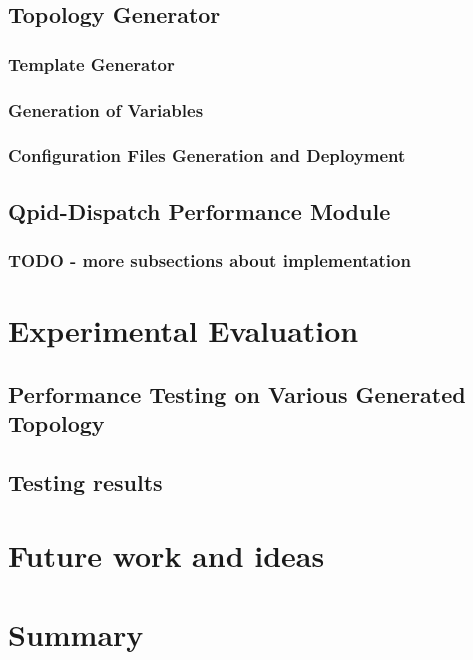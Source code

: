 \section{Topology Generator}

\subsection{Template Generator}

\subsection{Generation of Variables}

\subsection{Configuration Files Generation and Deployment}

\section{Qpid-Dispatch Performance Module}

\subsection{TODO - more subsections about implementation}

\chapter{Experimental Evaluation}
\label{Experimental Evaluation}

\section{Performance Testing on Various Generated Topology}

\section{Testing results}

\chapter{Future work and ideas}
\label{Future work and ideas}

\chapter{Summary}
\label{Conclusion}
